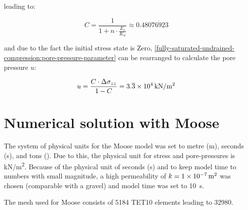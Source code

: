 \vspace{1em}

leading to:

\begin{equation}
    C = \frac{1}{1 + n \cdot \frac{E_s}{K_w}} \approx 0.48\overline{076923}
\end{equation}

and due to the fact the initial stress state is Zero,
\autoref{fully-saturated-undrained-compression:pore-pressure-parameter} can be
rearranged to calculate the pore pressure $u$:

\begin{equation}
    u = \frac{C \cdot \Delta \sigma_{zz}}{1 - C} =
    3.\overline{3}\times\SI{E4}{\si[per-mode =
            symbol]{\kilo\newton\per\square\metre}}
\end{equation}


\section{Numerical solution with Moose}
\label{fully-saturated-undrained-compression:sec:moose}

The system of physical units for the Moose model was set to metre
(\unit{\metre}), seconds (\unit{\second}), and tons (\unit{\ton}). Due to this,
the physical unit for stress and pore-pressures is \unit[per-mode =
    symbol]{\kilo\newton\per\square\metre}. Because of the physical unit of seconds
(\unit{\second}) and to keep model time to numbers with small magnitude, a high
permeability of $k = \qty{1E-7}{\square\metre}$ was chosen (comparable with a
gravel) and model time was set to \qty{10}{\second}.

The mesh used for Moose consists of \qty{5184}{} TET10 elements leading to
\qty{32980}{\DOF}.

